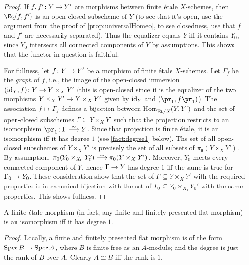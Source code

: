 \begin{proof}
	If $f,f'\colon Y\morphism Y'$ are morphisms between finite étale $X$-schemes, then $\Eq(f,f')$ is an open-closed subscheme of $Y$ (to see that it's open, use the argument from the proof of \cref{prop:universalHomeo}, to see closedness, use that $f$ and $f'$ are necessarily separated). Thus the equalizer equals $Y$ iff it contains $Y_0$, since $Y_0$ intersects all  connected components of $Y$ by assumptions. This shows that the functor in question is faithful.
	
	For fullness, let $f\colon Y\morphism Y'$ be a morphism of finite étale $X$-schemes. Let $\Gamma_f$ be the \emph{graph} of $f$, i.e., the image of the open-closed immersion $(\id_Y,f)\colon Y\morphism Y\times_XY'$ (this is open-closed since it is the equalizer of the two morphisms $Y\times_XY'\morphism Y\times_XY'$ given by $\operatorname{id}_Y$ and $(\pr_1,f\pr_1)$). The association $f\mapsto \Gamma_f$ defines a bijection between $\operatorname{Hom}_{\mathrm{\acute{E}t}/X}(Y,Y')$ and the set of open-closed subschemes $\Gamma\subseteq Y\times_XY'$ such that the projection restricts to an isomorphism $\pr_1\colon \Gamma\isomorphism Y$. Since that projection is finite étale, it is an isomorphism iff it has degree $1$ (see \cref{fact:degree1} below). The set of all open-closed subschemes of $Y\times_XY'$ is precisely the set of all subsets of $\pi_0(Y\times_XY')$. By assumption, $\pi_0(Y_0\times_{X_0}Y'_0)\isomorphism \pi_0(Y\times_XY')$. Moreover, $Y_0$ meets every connected component of $Y$, hence $\Gamma\morphism Y$ has degree $1$ iff the same is true for $\Gamma_0\morphism Y_0$. These consideration show that the set of $\Gamma\subseteq Y\times_XY'$ with the required properties is in canonical bijection with the set of $\Gamma_0\subseteq Y_0\times_{X_0}Y_0'$ with the same properties. This shows fullness.
\end{proof}
\begin{fact}\label{fact:degree1}
	A finite étale morphism (in fact, any finite and finitely presented flat morphism) is an isomorphism iff it has degree $1$.
\end{fact}
\begin{proof}
	Locally, a finite and finitely presented flat morphism is of the form $\Spec B\morphism \Spec A$, where $B$ is finite free as an $A$-module; and the degree is just the rank of $B$ over $A$. Clearly $A\cong B$ iff the rank is $1$.
\end{proof}
